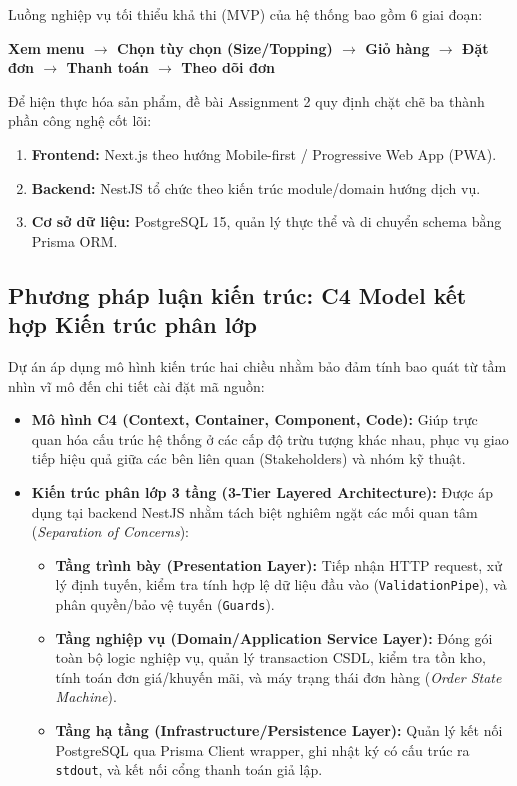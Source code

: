 \documentclass[11pt, a4paper]{article}
\begin{document}
Luồng nghiệp vụ tối thiểu khả thi (MVP) của hệ thống bao gồm 6 giai đoạn:
\begin{center}
	\textbf{\color{secondary} Xem menu $\to$ Chọn tùy chọn (Size/Topping) $\to$ Giỏ hàng $\to$ Đặt đơn $\to$ Thanh toán $\to$ Theo dõi đơn}
\end{center}

Để hiện thực hóa sản phẩm, đề bài Assignment 2 quy định chặt chẽ ba thành phần công nghệ cốt lõi:
\begin{enumerate}
	\item \textbf{Frontend:} Next.js theo hướng Mobile-first / Progressive Web App (PWA).
	\item \textbf{Backend:} NestJS tổ chức theo kiến trúc module/domain hướng dịch vụ.
	\item \textbf{Cơ sở dữ liệu:} PostgreSQL 15, quản lý thực thể và di chuyển schema bằng Prisma ORM.
\end{enumerate}

\subsection{Phương pháp luận kiến trúc: C4 Model kết hợp Kiến trúc phân lớp}

Dự án áp dụng mô hình kiến trúc hai chiều nhằm bảo đảm tính bao quát từ tầm nhìn vĩ mô đến chi tiết cài đặt mã nguồn:
\begin{itemize}
	\item \textbf{Mô hình C4 (Context, Container, Component, Code):} Giúp trực quan hóa cấu trúc hệ thống ở các cấp độ trừu tượng khác nhau, phục vụ giao tiếp hiệu quả giữa các bên liên quan (Stakeholders) và nhóm kỹ thuật.
	\item \textbf{Kiến trúc phân lớp 3 tầng (3-Tier Layered Architecture):} Được áp dụng tại backend NestJS nhằm tách biệt nghiêm ngặt các mối quan tâm (\textit{Separation of Concerns}):
	      \begin{itemize}
		      \item \textbf{Tầng trình bày (Presentation Layer):} Tiếp nhận HTTP request, xử lý định tuyến, kiểm tra tính hợp lệ dữ liệu đầu vào (\texttt{ValidationPipe}), và phân quyền/bảo vệ tuyến (\texttt{Guards}).
		      \item \textbf{Tầng nghiệp vụ (Domain/Application Service Layer):} Đóng gói toàn bộ logic nghiệp vụ, quản lý transaction CSDL, kiểm tra tồn kho, tính toán đơn giá/khuyến mãi, và máy trạng thái đơn hàng (\textit{Order State Machine}).
		      \item \textbf{Tầng hạ tầng (Infrastructure/Persistence Layer):} Quản lý kết nối PostgreSQL qua Prisma Client wrapper, ghi nhật ký có cấu trúc ra \texttt{stdout}, và kết nối cổng thanh toán giả lập.
	      \end{itemize}
\end{itemize}
\end{document}
